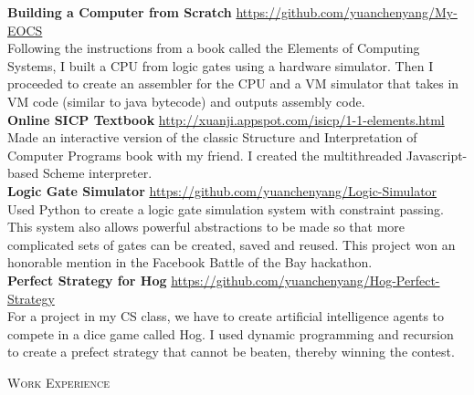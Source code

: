 \documentclass[9pt]{article}
\newenvironment{changemargin}[2]{%
  \begin{list}{}{%
      \setlength{\topsep}{0pt}%
      \setlength{\leftmargin}{#1}%
      \setlength{\rightmargin}{#2}%
      \setlength{\listparindent}{\parindent}%
      \setlength{\itemindent}{\parindent}%
      \setlength{\parsep}{\parskip}%
    }%
  \item[]}{\end{list}
}
\newcommand{\lineover}{
  \begin{changemargin}{-0.05in}{-0.05in}
    \vspace*{-8pt}
    \hrulefill \\
    \vspace*{-2pt}
  \end{changemargin}
}
\newcommand{\header}[1]{
  \begin{changemargin}{-0.5in}{-0.5in}
    \scshape{#1}\\
    \lineover
  \end{changemargin}
}
\newenvironment{body} {
  \vspace*{-16pt}
  \begin{changemargin}{-0.25in}{-0.5in}
  }	
  {\end{changemargin}
}
\begin{document}
\begin{body}
  \vspace{14pt}
  \textbf{Building a Computer from Scratch} \hfill \url{https://github.com/yuanchenyang/My-EOCS}\\
  Following the instructions from a book called the Elements of Computing Systems, I built a CPU from logic gates using a hardware simulator. Then I proceeded to create an assembler for the CPU and a VM simulator that takes in VM code (similar to java bytecode) and outputs assembly code. \\
  \medskip
  \textbf{Online SICP Textbook} \hfill \url{http://xuanji.appspot.com/isicp/1-1-elements.html}\\
  Made an interactive version of the classic Structure and Interpretation of Computer Programs book with my friend. I created the multithreaded Javascript-based Scheme interpreter.\\
  \medskip
  \textbf{Logic Gate Simulator} \hfill \url{https://github.com/yuanchenyang/Logic-Simulator}\\
  Used Python to create a logic gate simulation system with constraint passing. This system also allows powerful abstractions to be made so that more complicated sets of gates can be created, saved and reused. This project won an honorable mention in the Facebook Battle of the Bay hackathon.\\
  \medskip
  \textbf{Perfect Strategy for Hog} \hfill \url{https://github.com/yuanchenyang/Hog-Perfect-Strategy}\\
  For a project in my CS class, we have to create artificial intelligence agents to compete in a dice game called Hog. I used dynamic programming and recursion to create a prefect strategy that cannot be beaten, thereby winning the contest. \\
  \medskip  
\end{body}

\smallskip



\header{Work Experience}
\end{document}
